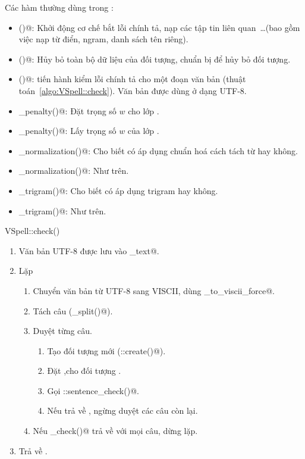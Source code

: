 \documentclass[a4paper,oneside,14pt]{extbook} %
\begin{document}
Các hàm thường dùng trong \verb@VSpell@:
\begin{itemize}
\item \verb@init()@: Khởi động cơ chế bắt lỗi chính tả, nạp các tập
  tin liên quan~\ldots (bao gồm việc nạp từ điển, ngram, danh sách tên
  riêng). 
\item \verb@cleanup()@: Hủy bỏ toàn bộ dữ liệu của đối tượng, chuẩn bị để
  hủy bỏ đối tượng.
\item \verb@check()@: tiến hành kiểm lỗi chính tả cho một đoạn văn
  bản (thuật toán~\ref{algo:VSpell::check}). Văn bản được dùng ở dạng
  UTF-8. 
\item \verb@set_penalty()@: Đặt trọng số $w$ cho lớp \verb@PenaltyDAG@.
\item \verb@get_penalty()@: Lấy trọng số $w$ của lớp
  \verb@PenaltyDAG@.
\item \verb@set_normalization()@: Cho biết có áp dụng chuẩn hoá cách
  tách từ hay không.
\item \verb@get_normalization()@: Như trên.
\item \verb@set_trigram()@: Cho biết có áp dụng trigram hay không.
\item \verb@get_trigram()@: Như trên.
\end{itemize}

\begin{algo}
\caption{VSpell::check()}
\label{algo:VSpell::check}
\begin{enumerate}
\item Văn bản UTF-8 được lưu vào _text@.
\item Lặp
  \begin{enumerate}
  \item Chuyển văn bản từ UTF-8 sang VISCII, dùng
    \verb@viet_to_viscii_force@.
  \item Tách câu (\verb@sentences_split()@).
  \item Duyệt từng câu.
    \begin{enumerate}
    \item Tạo đối tượng \verb@Text@ mới
      (\verb@TextFactory::create()@).
    \item Đặt \verb@offset@,\verb@length@ cho đối tượng \verb@Text@. 
    \item Gọi \verb@Text::sentence_check()@.
    \item Nếu trả về \verb@false@, ngừng duyệt các câu còn lại.
    \end{enumerate}
  \item Nếu \verb@sentence_check()@ trả về \verb@true@ với mọi câu,
    dừng lặp.
  \end{enumerate}
\item Trả về \verb@true@.
\end{enumerate}
\end{algo}
\end{document}
